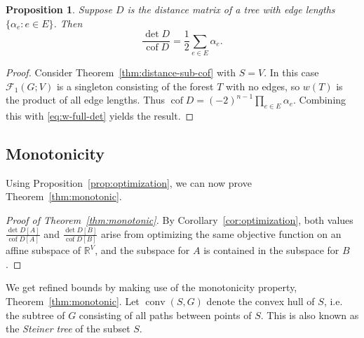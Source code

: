 \documentclass[12pt]{amsart}
\newtheorem{prop}[thm]{Proposition}
\theoremstyle{definition}
\newcommand{\RR}{\mathbb{R}}
\newcommand{\Da}{{D}}
\DeclareMathOperator{\cof}{cof}
\DeclareMathOperator{\conv}{conv}
\newcommand{\trees}{\mathcal{F}_1}
\begin{document}
\begin{prop}\label{prop:full-det-cof-ratio}
	Suppose $\Da$ is the distance matrix of a tree with edge lengths $\{\alpha_e \colon e \in E\}$.
	Then
	\[
		\frac{\det \Da}{\cof \Da} = \frac1{2} \sum_{e \in E} \alpha_e .
	\]
\end{prop}
\begin{proof}
Consider Theorem~\ref{thm:distance-sub-cof} with $S = V$.
In this case $\trees(G; V)$ is a singleton consisting of the forest $T$ with no edges, so $w({T})$ is the product of all edge lengths.
Thus $\cof \Da = (-2)^{n - 1} \prod_{e \in E} \alpha_e$.
Combining this with \eqref{eq:w-full-det} yields the result.
\end{proof}

\subsection{Monotonicity}


Using Proposition~\ref{prop:optimization}, we can now prove Theorem~\ref{thm:monotonic}.

\begin{proof}[Proof of Theorem~\ref{thm:monotonic}]
By Corollary~\ref{cor:optimization}, both values 
$\displaystyle
	\frac{\det D[A]}{\cof D[A]}
$ 
and
$\displaystyle
	\frac{\det D[B]}{\cof D[B]}
$
arise from optimizing the same objective function on an affine subspace of $\RR^V$, 
and the subspace for $A$ is contained in the subspace for $B$.
\end{proof}


We get refined bounds by making use of the monotonicity property, Theorem~\ref{thm:monotonic}. 
Let $\conv(S,G)$ denote the convex hull of $S$, i.e. the subtree of $G$ consisting of all paths between points of $S$.
This is also known as the {\em Steiner tree} of the subset $S$.
 
\end{document}
